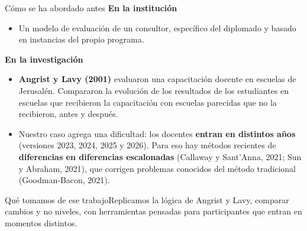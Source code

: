\documentclass[10pt,aspectratio=169]{beamer}
\newcommand{\sintesis}[2]{%
  \begin{block}{#1}#2\end{block}}
\begin{document}
\begin{frame}{Cómo se ha abordado antes}
  \textbf{En la institución}
  \begin{itemize}
    \item Un modelo de evaluación de un consultor, específico del diplomado y basado en instancias del propio programa.
  \end{itemize}
  \vspace{0.4em}
  \textbf{En la investigación}
  \begin{itemize}
    \item \textbf{Angrist y Lavy (2001)} evaluaron una capacitación docente en escuelas de Jerusalén. Compararon la evolución de los resultados de los estudiantes en escuelas que recibieron la capacitación con escuelas parecidas que no la recibieron, antes y después.
    \item Nuestro caso agrega una dificultad: los docentes \textbf{entran en distintos años} (versiones 2023, 2024, 2025 y 2026). Para eso hay métodos recientes de \textbf{diferencias en diferencias escalonadas} (Callaway y Sant'Anna, 2021; Sun y Abraham, 2021), que corrigen problemas conocidos del método tradicional (Goodman-Bacon, 2021).
  \end{itemize}
  \vspace{0.3em}
  \sintesis{Qué tomamos de ese trabajo}{Replicamos la lógica de Angrist y Lavy, comparar cambios y no niveles, con herramientas pensadas para participantes que entran en momentos distintos.}
\end{frame}
\end{document}
